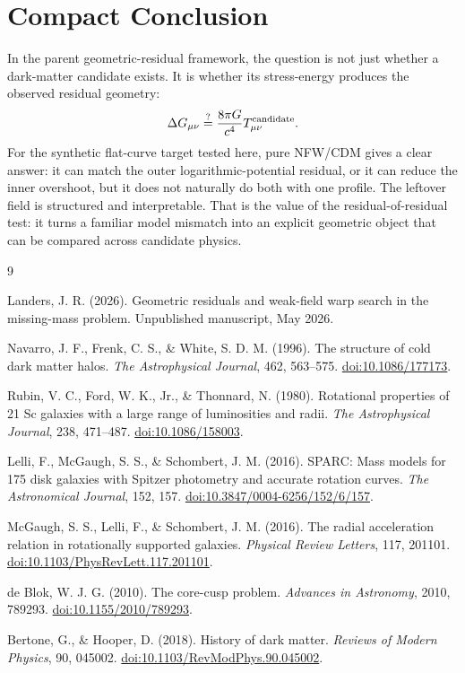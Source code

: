 \documentclass[10pt]{article}
\newcommand{\cG}{\frac{8\pi G}{c^4}}
\begin{document}
\section{Compact Conclusion}

In the parent geometric-residual framework, the question is not just whether a
dark-matter candidate exists. It is whether its stress-energy produces the
observed residual geometry:
\begin{equation}
\Delta G_{\mu\nu}
\stackrel{?}{=}
\cG T^{\rm candidate}_{\mu\nu}.
\end{equation}
For the synthetic flat-curve target tested here, pure NFW/CDM gives a clear
answer: it can match the outer logarithmic-potential residual, or it can reduce
the inner overshoot, but it does not naturally do both with one profile. The
leftover field is structured and interpretable. That is the value of the
residual-of-residual test: it turns a familiar model mismatch into an explicit
geometric object that can be compared across candidate physics.

\begingroup\small
\begin{thebibliography}{9}

Landers, J. R. (2026).
Geometric residuals and weak-field warp search in the missing-mass problem.
Unpublished manuscript, May 2026.

Navarro, J. F., Frenk, C. S., \& White, S. D. M. (1996).
The structure of cold dark matter halos.
\emph{The Astrophysical Journal}, 462, 563--575.
\href{https://doi.org/10.1086/177173}{doi:10.1086/177173}.

Rubin, V. C., Ford, W. K., Jr., \& Thonnard, N. (1980).
Rotational properties of 21 Sc galaxies with a large range of luminosities and radii.
\emph{The Astrophysical Journal}, 238, 471--487.
\href{https://doi.org/10.1086/158003}{doi:10.1086/158003}.

Lelli, F., McGaugh, S. S., \& Schombert, J. M. (2016).
SPARC: Mass models for 175 disk galaxies with Spitzer photometry and accurate rotation curves.
\emph{The Astronomical Journal}, 152, 157.
\href{https://doi.org/10.3847/0004-6256/152/6/157}{doi:10.3847/0004-6256/152/6/157}.

McGaugh, S. S., Lelli, F., \& Schombert, J. M. (2016).
The radial acceleration relation in rotationally supported galaxies.
\emph{Physical Review Letters}, 117, 201101.
\href{https://doi.org/10.1103/PhysRevLett.117.201101}{doi:10.1103/PhysRevLett.117.201101}.

de Blok, W. J. G. (2010).
The core-cusp problem.
\emph{Advances in Astronomy}, 2010, 789293.
\href{https://doi.org/10.1155/2010/789293}{doi:10.1155/2010/789293}.

Bertone, G., \& Hooper, D. (2018).
History of dark matter.
\emph{Reviews of Modern Physics}, 90, 045002.
\href{https://doi.org/10.1103/RevModPhys.90.045002}{doi:10.1103/RevModPhys.90.045002}.

\end{thebibliography}
\endgroup
\end{document}
